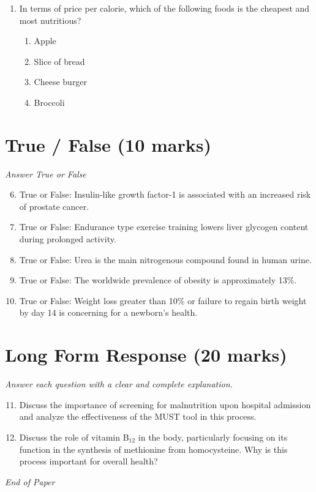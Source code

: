 \documentclass[12pt]{article}
\begin{document}
\begin{enumerate}[label=\arabic*.]
\begin{enumerate}[label=(\alph*)]
    \item \textgreater{} 95\%
    \item \textless{} 50\%
\end{enumerate}
\item In terms of price per calorie, which of the following foods is the cheapest and most nutritious?
\begin{enumerate}[label=(\alph*)]
    \item Apple
    \item Slice of bread
    \item Cheese burger
    \item Broccoli
\end{enumerate}
\end{enumerate}

\section*{True / False (10 marks)}
\textit{Answer True or False}
\begin{enumerate}[label=\arabic*.]
\setcounter{enumi}{5}
\item True or False: Insulin-like growth factor-1 is associated with an increased risk of prostate cancer.
\item True or False: Endurance type exercise training lowers liver glycogen content during prolonged activity.
\item True or False: Urea is the main nitrogenous compound found in human urine.
\item True or False: The worldwide prevalence of obesity is approximately 13\%.
\item True or False: Weight loss greater than 10\% or failure to regain birth weight by day 14 is concerning for a newborn's health.
\end{enumerate}

\section*{Long Form Response (20 marks)}
\textit{Answer each question with a clear and complete explanation.}
\begin{enumerate}[label=\arabic*.]
\setcounter{enumi}{10}
\item Discuss the importance of screening for malnutrition upon hospital admission and analyze the effectiveness of the MUST tool in this process.
\item Discuss the role of vitamin B$_{12}$ in the body, particularly focusing on its function in the synthesis of methionine from homocysteine. Why is this process important for overall health?
\end{enumerate}

\vfill
\noindent\textit{End of Paper}
\end{document}
